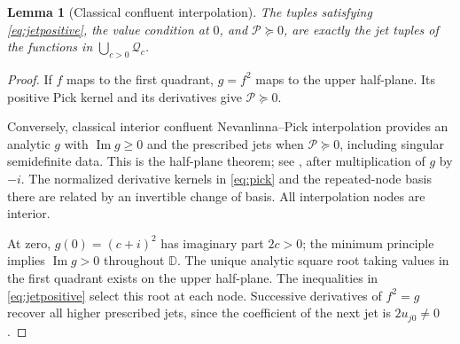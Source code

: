 \documentclass[11pt,a4paper]{article}
\newtheorem{lemma}[theorem]{Lemma}
\theoremstyle{remark}\newtheorem{remark}[theorem]{Remark}
\newcommand{\D}{\mathbb D}
\newcommand{\Ima}{\operatorname{Im}}
\begin{document}
\begin{lemma}[Classical confluent interpolation]\label{lem:pick}
The tuples satisfying \eqref{eq:jetpositive}, the value condition at
\(0\), and \(\mathcal P\succeq0\), are exactly the jet tuples of
the functions in \(\bigcup_{c>0}\mathcal Q_c\).
\end{lemma}
\begin{proof}
If \(f\) maps to the first quadrant, \(g=f^2\) maps to the
upper half-plane. Its positive Pick kernel and its derivatives give
\(\mathcal P\succeq0\).

Conversely, classical interior confluent Nevanlinna--Pick
interpolation provides an analytic \(g\) with \(\Ima g\geq0\)
and the prescribed jets when \(\mathcal P\succeq0\), including
singular semidefinite data. This is the half-plane theorem;
see \cite[Section~3, pp.~246--247]{clark}, after multiplication
of \(g\) by \(-i\). The normalized derivative kernels in
\eqref{eq:pick} and the repeated-node basis there are related by
an invertible change of basis. All interpolation nodes are interior.

At zero, \(g(0)=(c+i)^2\) has imaginary part \(2c>0\);
the minimum principle implies \(\Ima g>0\) throughout \(\D\).
The unique analytic square root taking values in the first
quadrant exists on the upper half-plane. The inequalities in
\eqref{eq:jetpositive} select this root at each node.
Successive derivatives of \(f^2=g\) recover all higher prescribed
jets, since the coefficient of the next jet is \(2u_{j0}\ne0\).
\end{proof}
\end{document}
